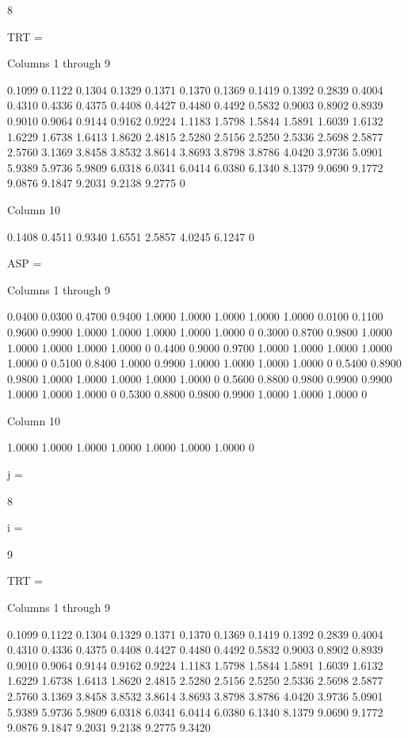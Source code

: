      8


TRT =

  Columns 1 through 9

    0.1099    0.1122    0.1304    0.1329    0.1371    0.1370    0.1369    0.1419    0.1392
    0.2839    0.4004    0.4310    0.4336    0.4375    0.4408    0.4427    0.4480    0.4492
    0.5832    0.9003    0.8902    0.8939    0.9010    0.9064    0.9144    0.9162    0.9224
    1.1183    1.5798    1.5844    1.5891    1.6039    1.6132    1.6229    1.6738    1.6413
    1.8620    2.4815    2.5280    2.5156    2.5250    2.5336    2.5698    2.5877    2.5760
    3.1369    3.8458    3.8532    3.8614    3.8693    3.8798    3.8786    4.0420    3.9736
    5.0901    5.9389    5.9736    5.9809    6.0318    6.0341    6.0414    6.0380    6.1340
    8.1379    9.0690    9.1772    9.0876    9.1847    9.2031    9.2138    9.2775         0

  Column 10

    0.1408
    0.4511
    0.9340
    1.6551
    2.5857
    4.0245
    6.1247
         0


ASP =

  Columns 1 through 9

    0.0400    0.0300    0.4700    0.9400    1.0000    1.0000    1.0000    1.0000    1.0000
    0.0100    0.1100    0.9600    0.9900    1.0000    1.0000    1.0000    1.0000    1.0000
         0    0.3000    0.8700    0.9800    1.0000    1.0000    1.0000    1.0000    1.0000
         0    0.4400    0.9000    0.9700    1.0000    1.0000    1.0000    1.0000    1.0000
         0    0.5100    0.8400    1.0000    0.9900    1.0000    1.0000    1.0000    1.0000
         0    0.5400    0.8900    0.9800    1.0000    1.0000    1.0000    1.0000    1.0000
         0    0.5600    0.8800    0.9800    0.9900    0.9900    1.0000    1.0000    1.0000
         0    0.5300    0.8800    0.9800    0.9900    1.0000    1.0000    1.0000         0

  Column 10

    1.0000
    1.0000
    1.0000
    1.0000
    1.0000
    1.0000
    1.0000
         0


j =

     8


i =

     9


TRT =

  Columns 1 through 9

    0.1099    0.1122    0.1304    0.1329    0.1371    0.1370    0.1369    0.1419    0.1392
    0.2839    0.4004    0.4310    0.4336    0.4375    0.4408    0.4427    0.4480    0.4492
    0.5832    0.9003    0.8902    0.8939    0.9010    0.9064    0.9144    0.9162    0.9224
    1.1183    1.5798    1.5844    1.5891    1.6039    1.6132    1.6229    1.6738    1.6413
    1.8620    2.4815    2.5280    2.5156    2.5250    2.5336    2.5698    2.5877    2.5760
    3.1369    3.8458    3.8532    3.8614    3.8693    3.8798    3.8786    4.0420    3.9736
    5.0901    5.9389    5.9736    5.9809    6.0318    6.0341    6.0414    6.0380    6.1340
    8.1379    9.0690    9.1772    9.0876    9.1847    9.2031    9.2138    9.2775    9.3420

